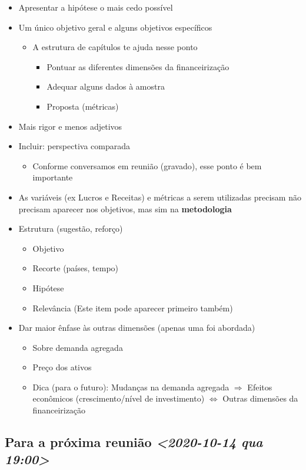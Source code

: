 \documentclass[11pt]{article}
\begin{document}
\begin{itemize}
\item Apresentar a hipótese o mais cedo possível
\item Um único objetivo geral e alguns objetivos específicos
\begin{itemize}
\item A estrutura de capítulos te ajuda nesse ponto
\begin{itemize}
\item Pontuar as diferentes dimensões da financeirização
\item Adequar alguns dados à amostra
\item Proposta (métricas)
\end{itemize}
\end{itemize}
\item Mais rigor e menos adjetivos
\item Incluir: perspectiva comparada
\begin{itemize}
\item Conforme conversamos em reunião (gravado), esse ponto é bem importante
\end{itemize}
\item As variáveis (ex Lucros e Receitas) e métricas a serem utilizadas precisam não precisam aparecer nos objetivos, mas sim na \textbf{metodologia}
\item Estrutura (sugestão, reforço)
\begin{itemize}
\item Objetivo
\item Recorte (países, tempo)
\item Hipótese
\item Relevância (Este item pode aparecer primeiro também)
\end{itemize}
\item Dar maior ênfase às outras dimensões (apenas uma foi abordada)
\begin{itemize}
\item Sobre demanda agregada
\item Preço dos ativos
\item Dica (para o futuro): Mudanças na demanda agregada \(\Rightarrow\) Efeitos econômicos (crescimento/nível de investimento) \(\Leftrightarrow\) Outras dimensões da financeirização
\end{itemize}
\end{itemize}


\subsection*{Para a próxima reunião \textit{<2020-10-14 qua 19:00>}}
\label{sec:org906296c}
\end{document}
